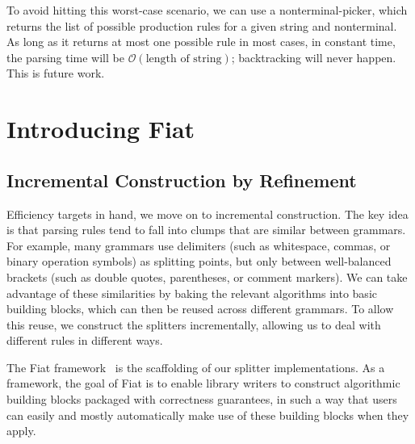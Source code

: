   To avoid hitting this worst-case scenario, we can use a nonterminal-picker, which returns the list of possible production rules for a given string and nonterminal.  As long as it returns at most one possible rule in most cases, in constant time, the parsing time will be $\mathcal O(\text{length of string})$; backtracking will never happen.  This is future work.\label{sec:worst-case}
  
\section{Introducing Fiat}
  \subsection{Incremental Construction by Refinement}
  Efficiency targets in hand, we move on to incremental construction.  The key idea is that parsing rules tend to fall into clumps that are similar between grammars.  For example, many grammars use delimiters (such as whitespace, commas, or binary operation symbols) as splitting points, but only between well-balanced brackets (such as double quotes, parentheses, or comment markers).  We can take advantage of these similarities by baking the relevant algorithms into basic building blocks, which can then be reused across different grammars.  To allow this reuse, we construct the splitters incrementally, allowing us to deal with different rules in different ways.
  
  The Fiat framework~\cite{fiat} is the scaffolding of our splitter implementations.  As a framework, the goal of Fiat is to enable library writers to construct algorithmic building blocks packaged with correctness guarantees, in such a way that users can easily and mostly automatically make use of these building blocks when they apply. 
  
